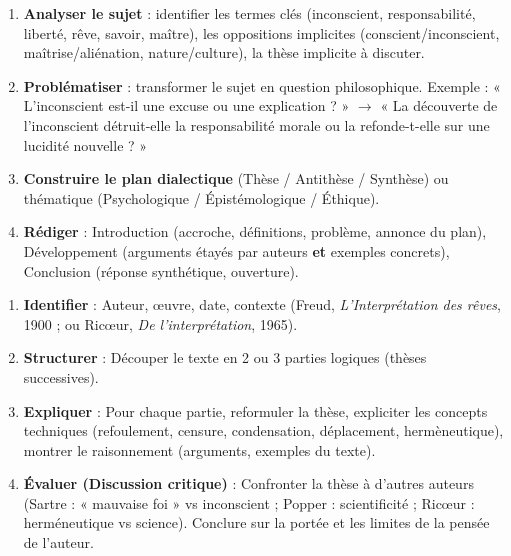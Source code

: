 \documentclass[11pt]{article}
\newcounter{popsec}
\newcounter{popsub}
\newcommand{\courssub}[1]{%
  \stepcounter{popsub}%
  \par\vspace{9pt}\noindent{\popxbold\fontsize{11.5}{13}\selectfont\color{popink}{\color{poporange}\thepopsec.\thepopsub}\hspace{6pt}#1}\par\nopagebreak\vspace{4pt}
}
\begin{document}
\courssub{Méthode et entraînement au Bac}

\begin{methode}
\begin{enumerate}
\item \textbf{Analyser le sujet} : identifier les termes clés (inconscient, responsabilité, liberté, rêve, savoir, maître), les oppositions implicites (conscient/inconscient, maîtrise/aliénation, nature/culture), la thèse implicite à discuter.
\item \textbf{Problématiser} : transformer le sujet en question philosophique. Exemple : « L'inconscient est-il une excuse ou une explication ? » $\rightarrow$ « La découverte de l'inconscient détruit-elle la responsabilité morale ou la refonde-t-elle sur une lucidité nouvelle ? »
\item \textbf{Construire le plan dialectique} (Thèse / Antithèse / Synthèse) ou thématique (Psychologique / Épistémologique / Éthique).
\item \textbf{Rédiger} : Introduction (accroche, définitions, problème, annonce du plan), Développement (arguments étayés par auteurs \textbf{et} exemples concrets), Conclusion (réponse synthétique, ouverture).
\end{enumerate}
\end{methode}

\begin{methode}
\begin{enumerate}
\item \textbf{Identifier} : Auteur, œuvre, date, contexte (Freud, \emph{L'Interprétation des rêves}, 1900 ; ou Ricœur, \emph{De l'interprétation}, 1965).
\item \textbf{Structurer} : Découper le texte en 2 ou 3 parties logiques (thèses successives).
\item \textbf{Expliquer} : Pour chaque partie, reformuler la thèse, expliciter les concepts techniques (refoulement, censure, condensation, déplacement, hermèneutique), montrer le raisonnement (arguments, exemples du texte).
\item \textbf{Évaluer (Discussion critique)} : Confronter la thèse à d'autres auteurs (Sartre : « mauvaise foi » vs inconscient ; Popper : scientificité ; Ricœur : herméneutique vs science). Conclure sur la portée et les limites de la pensée de l'auteur.
\end{enumerate}
\end{methode}
\end{document}
